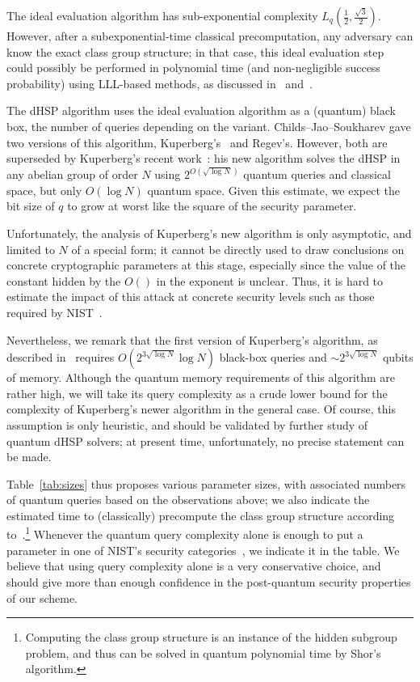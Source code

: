 \documentclass{llncs}
\begin{document}
The ideal evaluation algorithm has sub-exponential complexity
$L_q(\frac{1}{2},\frac{\sqrt{3}}{2})$. However, after a subexponential-time
classical precomputation, any adversary can know the exact class group structure;
in that case, this ideal evaluation step could possibly be performed in polynomial
time (and non-negligible success probability)
using LLL-based methods, as discussed in~\cite{Stolbunov2012}
and~\cite[\S5]{cryptoeprint:2006:291}.

The dHSP algorithm uses the
ideal evaluation algorithm as a (quantum) black box, the number of
queries depending on the variant. Childs--Jao--Soukharev gave two
versions of this algorithm, Kuperberg's~\cite{Kup} and Regev's\cite{regev04}.
However, both are superseded by Kuperberg's recent work~\cite{Kuperberg2013}:
his new algorithm solves the dHSP in any abelian group of order $N$
using $2^{O(\sqrt{\log N})}$ quantum queries and classical space,
but only $O(\log N)$ quantum space. 
Given this estimate, we expect the bit size of $q$ to grow at
worst like the square of the security parameter.

Unfortunately, the analysis of Kuperberg's new algorithm is only asymptotic, 
and limited to $N$ of a special form; it cannot be directly used
to draw conclusions on concrete cryptographic parameters at this stage,
especially since the value of the constant hidden by the $O()$ in the
exponent is unclear.
Thus, it is hard to estimate the impact of this attack
at concrete security levels
such as those required by NIST~\cite{NIST2016}.

Nevertheless, we remark that the first version of Kuperberg's
algorithm, as described in~\cite[Algorithm~5.1 and
Remark~5.2]{regev04} requires $O(2^{3\sqrt{\log N}}\log N)$ black-box
queries and $\sim 2^{3\sqrt{\log N}}$ qubits of memory.  Although the
quantum memory requirements of this algorithm are rather high, we will
take its query complexity as a crude lower bound for the complexity of
Kuperberg's newer algorithm in the general case.  Of course, this
assumption is only heuristic, and should be validated by further study
of quantum dHSP solvers; at present time, unfortunately, no precise
statement can be made.

Table~\ref{tab:sizes} thus proposes various parameter sizes, with
associated numbers of quantum queries based on the observations above;
we also indicate the estimated time to (classically) precompute the
class group structure according
to~\cite{10.1007/978-3-642-14081-5_15}.\footnote{%
  Computing the class group structure is an instance of
  the hidden subgroup problem, and thus can be solved in quantum
  polynomial time by Shor's algorithm.
}
Whenever the quantum query
complexity alone is enough to put a parameter in one of NIST's
security categories~\cite{NIST2016}, we indicate it in the table. We
believe that using query complexity alone is a very conservative
choice, and should give more than enough confidence in the
post-quantum security properties of our scheme.
\end{document}

